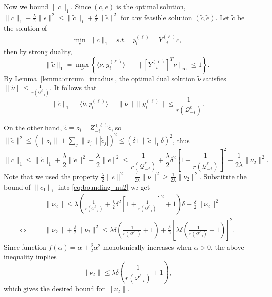 \documentclass[twoside,11pt]{article}
\numberwithin{equation}{section}
\begin{document}
Now we bound $\|c\|_1$.
Since $(c,e)$ is the optimal solution, $\|c\|_1+\frac{\lambda}{2}\|e\|^2 \leq \|\tilde{c}\|_1 + \frac{\lambda}{2}\|\tilde{e}\|^2$ for any feasible solution $(\tilde{c},\tilde{e})$. Let $\tilde{c}$ be the solution of
\begin{equation}\label{eq:Opt_y only}
\begin{aligned}
\min_{c} \; \|c\|_1 \quad
s.t. \quad y^{(\ell)}_i=Y^{(\ell)}_{-i}c,
\end{aligned}
\end{equation}
then by strong duality,
$$\|\tilde{c}\|_1 = \max_{\nu}\left\{\langle\nu,y^{(\ell)}_i\rangle \text{ }|\text{ } \|[Y^{(\ell)}_{-i}]^T\nu\|_{\infty}\leq 1\right\}.$$
By Lemma~\ref{lemma:circum_inradius}, the optimal dual solution $\tilde{\nu}$ satisfies $\|\tilde{\nu}\|\leq \frac{1}{r(\mathcal{Q}_{-i}^{\ell})}$. It follows that
$$\|\tilde{c}\|_1= \langle\tilde{\nu},y^{(\ell)}_i\rangle = \|\tilde{\nu}\|\|y^{(\ell)}_i\|\leq \frac{1}{r(\mathcal{Q}_{-i}^{\ell})}.$$

On the other hand, $\tilde{e} = z_i - Z_{-i}^{(\ell)}\tilde{c}$, so $\|\tilde{e}\|^2 \leq (\|z_i\|+\sum_j \|z_j\||\tilde{c}_j|)^2\leq (\delta + \|\tilde{c}\|_1\delta)^2$, thus
$$\|c\|_1 \leq \|\tilde{c}\|_1 + \frac{\lambda}{2}\|\tilde{e}\|^2 - \frac{\lambda}{2}\|e\|^2\leq \frac{1}{r{(\mathcal{Q}_{-i}^{\ell})}}+\frac{\lambda}{2}\delta^2\left[1+\frac{1}{r{(\mathcal{Q}_{-i}^{\ell})}}\right]^2-\frac{1}{2\lambda}\|\nu_2\|^2.$$
Note that we used the property $\frac{\lambda}{2}\|e\|^2=\frac{1}{2\lambda}\|\nu\|^2\geq\frac{1}{2\lambda}\|\nu_2\|^2$. Substitute the bound of $\|c_1\|_1$ into \eqref{eq:bounding_nu2} we get
\begin{align*}
  &&\;&\|\nu_2\|\leq \lambda \left(\frac{1}{r(\mathcal{Q}_{-i}^{\ell})}+\frac{\lambda}{2}\delta^2\left[1+\frac{1}{r(\mathcal{Q}_{-i}^{\ell})}\right]^2+1\right) \delta-\frac{\delta}{2}\|\nu_2\|^2\\
  \Leftrightarrow&&\;
   &\|\nu_2\|+\frac{\delta}{2}\|\nu_2\|^2\leq \lambda\delta\left(\frac{1}{r(\mathcal{Q}_{-i}^{\ell})}+1\right)+ \frac{\delta}{2} \left[\lambda\delta\left(\frac{1}{r(\mathcal{Q}_{-i}^{\ell})}+1\right)\right]^2 .
\end{align*}
Since function $f(\alpha)=\alpha+\frac{\delta}{2}\alpha^2$ monotonically increases when $\alpha>0$, the above inequality implies
\begin{equation}\label{eq:nu2_bound}
  \|\nu_2\| \leq \lambda\delta\left(\frac{1}{r(\mathcal{Q}_{-i}^{\ell})}+1\right),
\end{equation}
which gives the desired bound for $\|\nu_2\|$.
\end{document}
